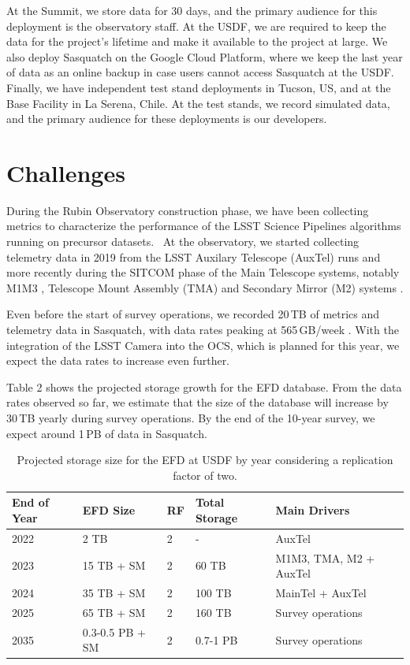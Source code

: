 At the Summit, we store data for 30 days, and the primary audience for this deployment is the observatory staff. At the USDF, we are required to keep the data for the project's lifetime and make it available to the project at large. We also deploy Sasquatch on the Google Cloud Platform, where we keep the last year of data as an online backup in case users cannot access Sasquatch at the USDF. Finally, we have independent test stand deployments in Tucson, US, and at the Base Facility in La Serena, Chile. At the test stands, we record simulated data, and the primary audience for these deployments is our developers.

\section{Challenges}
\label{sec:challenges}

During the Rubin Observatory construction phase, we have been collecting metrics to characterize the performance of the LSST Science Pipelines algorithms running on precursor datasets.  \cite{DMTN-091,2022SPIE12189E..0MG} At the observatory, we started collecting telemetry data in 2019 from the LSST Auxilary Telescope (AuxTel) runs and more recently during the SITCOM phase of the Main Telescope systems, notably M1M3 \cite{SITCOMTN-088}, Telescope Mount Assembly (TMA) \cite{SITCOMTN-121} and Secondary Mirror (M2) systems \cite{SITCOMTN-120}.

Even before the start of survey operations, we recorded 20\,TB of metrics and telemetry data in Sasquatch, with data rates peaking at 565\,GB/week \cite{SQR-085}. With the integration of the LSST Camera into the OCS, which is planned for this year, we expect the data rates to increase even further.

Table 2 shows the projected storage growth for the EFD database. From the data rates observed so far, we estimate that the size of the database will increase by 30\,TB yearly during survey operations. By the end of the 10-year survey, we expect around 1\,PB of data in Sasquatch.

\begin{table}[ht]
    \centering
    \caption{Projected storage size for the EFD at USDF by year considering a replication factor of two.}
    \begin{tabular}{@{}lllll@{}}
        \toprule
        \textbf{End of Year} & \textbf{EFD Size} & \textbf{RF} & \textbf{Total Storage} & \textbf{Main Drivers} \\
        \midrule
        2022 & 2 TB & 2 & - & AuxTel \\
        2023 & 15 TB + SM & 2 & 60 TB & M1M3, TMA, M2 + AuxTel \\
        2024 & 35 TB + SM & 2 & 100 TB & MainTel + AuxTel \\
        2025 & 65 TB + SM & 2 & 160 TB & Survey operations \\
        2035 & 0.3-0.5 PB + SM & 2 & 0.7-1 PB & Survey operations \\
        \bottomrule
    \end{tabular}
\end{table}

